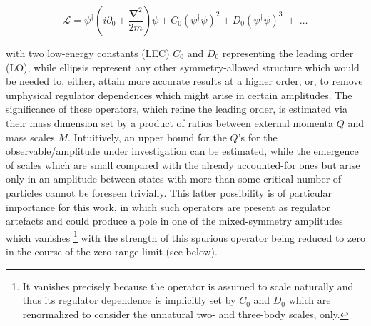 \documentclass[preprint,12pt]{elsarticle}
\newcommand{\ve}[1]{\ensuremath{\boldsymbol{#1}}}
\begin{document}
\begin{equation}
    \mathcal{L} = \psi^\dagger \left( i\partial_0 + \frac{\ve{\nabla}^2}{2m}\right)\psi
     +  C_0\left(\psi^\dagger \psi\right)^2
     +  D_0\left(\psi^\dagger\psi\right)^3 ~+~\ldots
\end{equation}

with two low-energy constants (LEC) $C_0$ and $D_0$ representing the leading order (LO), while ellipsis represent
any other symmetry-allowed structure which would be needed to, either, attain more accurate results at a higher order,
or, to remove unphysical regulator dependences which might arise in certain amplitudes.
The significance of these operators, which refine the leading order, is estimated via their mass dimension
set by a product of ratios between external momenta $Q$ and mass scales $M$.
Intuitively, an upper bound for the $Q$'s for the observable/amplitude under investigation can be estimated, while
the emergence of scales which are small compared with the already accounted-for ones but arise only
in an amplitude between states with more than some critical number of particles cannot be foreseen trivially.
This latter possibility is of particular importance for this work, in which such operators are present as
regulator artefacts and could produce a pole in one of the mixed-symmetry amplitudes which vanishes
\footnote{It vanishes precisely because the operator is assumed to scale naturally and thus its regulator
dependence is implicitly set by $C_0$ and $D_0$ which are renormalized to consider the unnatural two- and three-body scales,
only.} with the strength of this spurious operator being reduced to zero in the course of the zero-range limit (see below).

\end{document}
